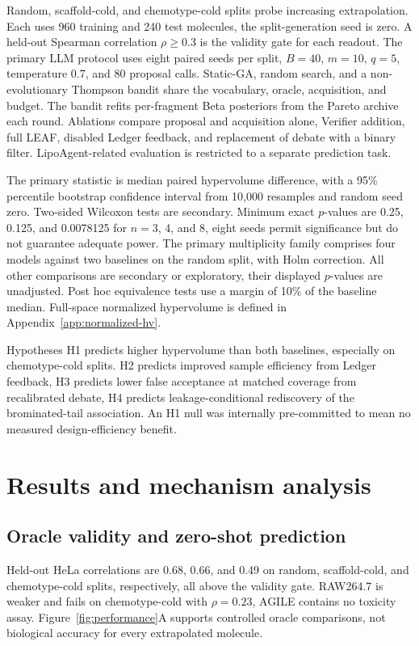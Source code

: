 \documentclass[11pt]{article}
\begin{document}
Random, scaffold-cold, and chemotype-cold splits probe increasing extrapolation. Each uses 960 training and 240 test molecules, the split-generation seed is zero. A held-out Spearman correlation $\rho\ge0.3$ is the validity gate for each readout. The primary LLM protocol uses eight paired seeds per split, $B=40$, $m=10$, $q=5$, temperature 0.7, and 80 proposal calls. Static-GA, random search, and a non-evolutionary Thompson bandit share the vocabulary, oracle, acquisition, and budget. The bandit refits per-fragment Beta posteriors from the Pareto archive each round. Ablations compare proposal and acquisition alone, Verifier addition, full LEAF, disabled Ledger feedback, and replacement of debate with a binary filter. LipoAgent-related evaluation is restricted to a separate prediction task.

The primary statistic is median paired hypervolume difference, with a 95\% percentile bootstrap confidence interval from 10,000 resamples and random seed zero. Two-sided Wilcoxon tests are secondary. Minimum exact $p$-values are 0.25, 0.125, and 0.0078125 for $n=3$, 4, and 8, eight seeds permit significance but do not guarantee adequate power. The primary multiplicity family comprises four models against two baselines on the random split, with Holm correction. All other comparisons are secondary or exploratory, their displayed $p$-values are unadjusted. Post hoc equivalence tests use a margin of 10\% of the baseline median. Full-space normalized hypervolume is defined in Appendix~\ref{app:normalized-hv}. 

Hypotheses H1 predicts higher hypervolume than both baselines, especially on chemotype-cold splits. H2 predicts improved sample efficiency from Ledger feedback, H3 predicts lower false acceptance at matched coverage from recalibrated debate, H4 predicts leakage-conditional rediscovery of the brominated-tail association. An H1 null was internally pre-committed to mean no measured design-efficiency benefit. 

\section{Results and mechanism analysis}
\label{sec:results}
\subsection{Oracle validity and zero-shot prediction}
\label{sec:validity}
Held-out HeLa correlations are 0.68, 0.66, and 0.49 on random, scaffold-cold, and chemotype-cold splits, respectively, all above the validity gate. RAW264.7 is weaker and fails on chemotype-cold with $\rho=0.23$, AGILE contains no toxicity assay. Figure~\ref{fig:performance}A supports controlled oracle comparisons, not biological accuracy for every extrapolated molecule.
\end{document}
